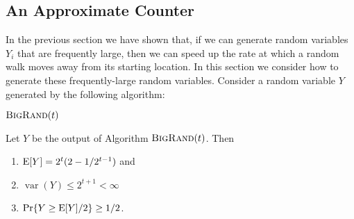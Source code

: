 \documentclass{patmorin}
\newcommand{\bigrand}{\textsc{BigRand}}
\DeclareMathOperator{\var}{var}
\begin{document}
\subsection{An Approximate Counter}

In the previous section we have shown that, if we can generate random
variables $Y_i$ that are frequently large, then we can speed up the
rate at which a random walk moves away from its starting location.  In
this section we consider how to generate these frequently-large random
variables.  Consider a random variable $Y$ generated by the following
algorithm:

\noindent
\begin{minipage}{\textwidth}
$\bigrand(t)$
\begin{algorithmic}[1]
  \ELSE
  \ENDIF
\ENDWHILE
{}
\end{algorithmic}
\end{minipage}

\begin{lem}
Let $Y$ be the output of Algorithm $\bigrand(t)$.  Then 
\begin{enumerate}
\item $\mathrm{E}[Y]=2^t(2-1/2^{t-1})$ and
\item $\var(Y) \le 2^{t+1} < \infty$
\item $\Pr\{Y \ge \mathrm{E}[Y] / 2\} \ge 1/2$.
\end{enumerate}
\end{lem}
\end{document}
